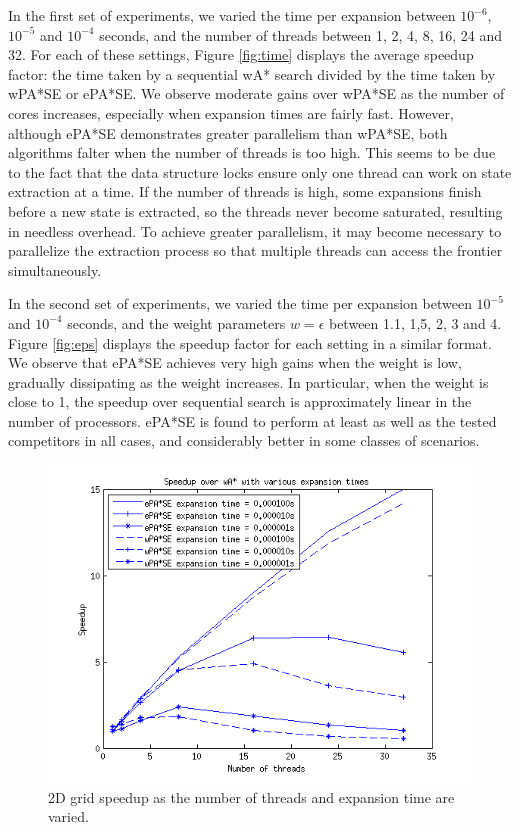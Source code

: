 \documentclass[letterpaper]{article}
\begin{document}
In the first set of experiments, we varied the time per expansion between $10^{-6}$, $10^{-5}$ and $10^{-4}$ seconds, and the number of threads between 1, 2, 4, 8, 16, 24 and 32. For each of these settings, Figure \ref{fig:time} displays the average speedup factor: the time taken by a sequential wA* search divided by the time taken by wPA*SE or ePA*SE. We observe moderate gains over wPA*SE as the number of cores increases, especially when expansion times are fairly fast. However, although ePA*SE demonstrates greater parallelism than wPA*SE, both algorithms falter when the number of threads is too high. This seems to be due to the fact that the data structure locks ensure only one thread can work on state extraction at a time. If the number of threads is high, some expansions finish before a new state is extracted, so the threads never become saturated, resulting in needless overhead. To achieve greater parallelism, it may become necessary to parallelize the extraction process so that multiple threads can access the frontier simultaneously.

In the second set of experiments, we varied the time per expansion between $10^{-5}$ and $10^{-4}$ seconds, and the weight parameters $w=\epsilon$ between 1.1, 1,5, 2, 3 and 4. Figure \ref{fig:eps} displays the speedup factor for each setting in a similar format. We observe that ePA*SE achieves very high gains when the weight is low, gradually dissipating as the weight increases. In particular, when the weight is close to 1, the speedup over sequential search is approximately linear in the number of processors. ePA*SE is found to perform at least as well as the tested competitors in all cases, and considerably better in some classes of scenarios.

\begin{figure}[fig:time]
\centering\includegraphics[scale=0.55]{time_sweep_all.png}
\caption{2D grid speedup as the number of threads and expansion time are varied.}
\end{figure}
\end{document}
